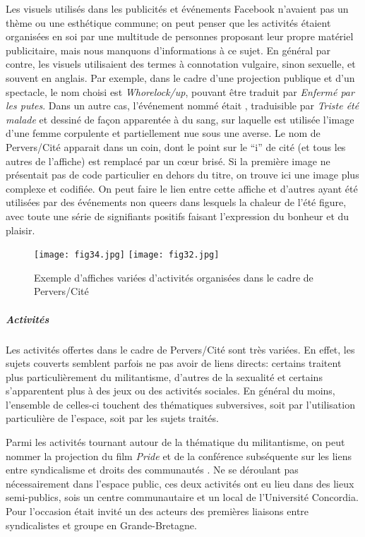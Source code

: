 Les visuels utilisés dans les publicités et événements Facebook n'avaient pas un thème ou une esthétique commune; on peut penser que les activités étaient organisées en soi par une multitude de personnes proposant leur propre matériel publicitaire, mais nous manquons d'informations à ce sujet.
En général par contre, les visuels utilisaient des termes à connotation vulgaire, sinon sexuelle, et souvent en anglais.
Par exemple, dans le cadre d'une projection publique et d'un spectacle, le nom choisi est \emph{Whorelock/up}, pouvant être traduit par \emph{Enfermé par les putes}.
Dans un autre cas, l'événement nommé était , traduisible par \emph{Triste été malade} et dessiné de façon apparentée à du sang, sur laquelle est utilisée l'image d'une femme corpulente et partiellement nue sous une averse.
Le nom de Pervers/Cité apparait dans un coin, dont le point sur le \enquote{i} de cité (et tous les autres de l'affiche) est remplacé par un cœur brisé.
Si la première image ne présentait pas de code particulier en dehors du titre, on trouve ici une image plus complexe et codifiée.
On peut faire le lien entre cette affiche et d'autres ayant été utilisées par des événements non queers dans lesquels la chaleur de l'été figure, avec toute une série de signifiants positifs faisant l'expression du bonheur et du plaisir.

\begin{figure}
\centering
{}
{\texttt{[image: fig34.jpg]}}
{\texttt{[image: fig32.jpg]}}
\caption{Exemple d'affiches variées d'activités organisées dans le cadre de Pervers/Cité}\label{figs3132}
\end{figure}

\subparagraph{Activités}
\label{subsec:activitesperverscite}
Les activités offertes dans le cadre de Pervers/Cité sont très variées.
En effet, les sujets couverts semblent parfois ne pas avoir de liens directs: certains traitent plus particulièrement du militantisme, d'autres de la sexualité et certains s'apparentent plus à des jeux ou des activités sociales.
En général du moins, l'ensemble de celles-ci touchent des thématiques subversives, soit par l'utilisation particulière de l'espace, soit par les sujets traités.

Parmi les activités tournant autour de la thématique du militantisme, on peut nommer la projection du film \emph{Pride} et de la conférence subséquente sur les liens entre syndicalisme et droits des communautés \lgbt{}.
Ne se déroulant pas nécessairement dans l'espace public, ces deux activités ont eu lieu dans des lieux semi-publics, sois un centre communautaire et un local de l'Université Concordia.
Pour l'occasion était invité un des acteurs  des premières liaisons entre syndicalistes et groupe \lgbt{} en Grande-Bretagne.

